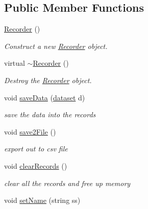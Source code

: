 \subsection*{Public Member Functions}
\begin{DoxyCompactItemize}
\item 
\mbox{\label{classRecorder_af0b4f40e7c67f16b0ffff13712149d78}} 
\hyperlink{classRecorder_af0b4f40e7c67f16b0ffff13712149d78}{Recorder} ()
\begin{DoxyCompactList}\small\item\em Construct a new \hyperlink{classRecorder}{Recorder} object. \end{DoxyCompactList}\item 
\mbox{\label{classRecorder_a6b3c569577fcdc298d8d4a6a2b96e9a9}} 
virtual \hyperlink{classRecorder_a6b3c569577fcdc298d8d4a6a2b96e9a9}{$\sim$\+Recorder} ()
\begin{DoxyCompactList}\small\item\em Destroy the \hyperlink{classRecorder}{Recorder} object. \end{DoxyCompactList}\item 
void \hyperlink{classRecorder_af6314348fd2c47bd074feb6506b6464d}{save\+Data} (\hyperlink{structdataset}{dataset} d)
\begin{DoxyCompactList}\small\item\em save the data into the records \end{DoxyCompactList}\item 
\mbox{\label{classRecorder_a635023e6472fcf2422b4d814936cf771}} 
void \hyperlink{classRecorder_a635023e6472fcf2422b4d814936cf771}{save2\+File} ()
\begin{DoxyCompactList}\small\item\em export out to csv file \end{DoxyCompactList}\item 
\mbox{\label{classRecorder_a79eefa7ff1ed1f6da3cb1e094d675776}} 
void \hyperlink{classRecorder_a79eefa7ff1ed1f6da3cb1e094d675776}{clear\+Records} ()
\begin{DoxyCompactList}\small\item\em clear all the records and free up memory \end{DoxyCompactList}\item 
void \hyperlink{classRecorder_a77bb320101cee41ef8c6e3c24829c0a9}{set\+Name} (string ss)

\end{DoxyCompactItemize}
